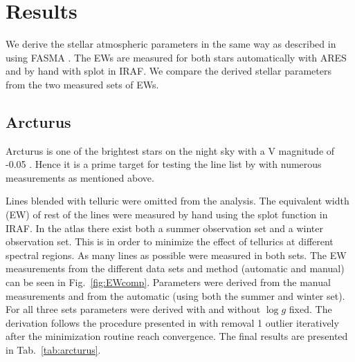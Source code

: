 \documentclass{aa}
\begin{document}
\section{Results}
\label{sec:results}

We derive the stellar atmospheric parameters in the same way as described in
\citet{Andreasen2016} using FASMA \citep{Andreasen2017a}. The EWs are measured
for both stars automatically with ARES \citep{Sousa2015a} and by hand with splot
in IRAF. We compare the derived stellar parameters from the two measured sets of
EWs.


\subsection{Arcturus}
\label{sec:arcturus}

Arcturus is one of the brightest stars on the night sky with a V magnitude of
-0.05 \citep{Ducati2002}. Hence it is a prime target for testing the line list
by \cite{Andreasen2016} with numerous measurements as mentioned above.

Lines blended with telluric were omitted from the analysis. The equivalent width
(EW) of rest of the lines were measured by hand using the splot function in
IRAF. In the atlas there exist both a summer observation set and a winter
observation set. This is in order to minimize the effect of tellurics at
different spectral regions. As many lines as possible were measured in both
sets. The EW measurements from the different data sets and method (automatic and
manual) can be seen in Fig.~\ref{fig:EWcomp}. Parameters were derived from the
manual measurements and from the automatic (using both the summer and winter
set). For all three sets parameters were derived with and without $\log g$
fixed. The derivation follows the procedure presented in \citet{Andreasen2016}
with removal 1 outlier iteratively after the minimization routine
\citep{Andreasen2017a} reach convergence. The final results are presented in
Tab.~\ref{tab:arcturus}.
\end{document}
